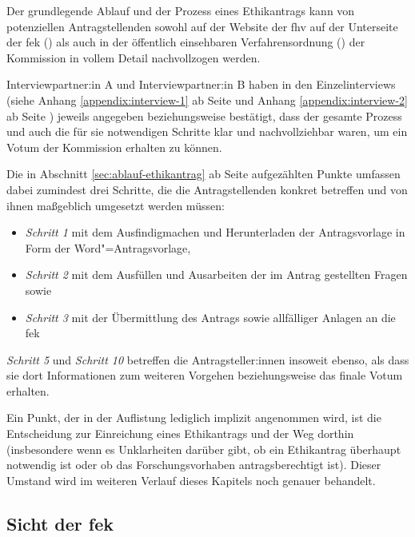 \documentclass[a4paper,12pt,twoside,numbers=noendperiod]{scrreprt}
\begin{document}
Der grundlegende Ablauf und der Prozess eines Ethikantrags kann von potenziellen Antragstellenden sowohl auf der Website der \ac{fhv} auf der Unterseite der \ac{fek} (\cite{fachhochschule_vorarlberg_gmbh_forschungsethik-kommission_2021}) als auch in der öffentlich einsehbaren Verfahrensordnung (\cite{forschungsethik-kommission_der_fachhochschule_vorarlberg_verfahrensordnung_2020}) der Kommission in vollem Detail nachvollzogen werden.

Interviewpartner:in A und Interviewpartner:in B haben in den Einzelinterviews (siehe Anhang \ref{appendix:interview-1} ab Seite \pageref{appendix:interview-1} und Anhang \ref{appendix:interview-2} ab Seite \pageref{appendix:interview-2}) jeweils angegeben beziehungsweise bestätigt, dass der gesamte Prozess und auch die für sie notwendigen Schritte klar und nachvollziehbar waren, um ein Votum der Kommission erhalten zu können.

\medskip

Die in Abschnitt \ref{sec:ablauf-ethikantrag} ab Seite \pageref{sec:ablauf-ethikantrag} aufgezählten Punkte umfassen dabei zumindest drei Schritte, die die Antragstellenden konkret betreffen und von ihnen maßgeblich umgesetzt werden müssen:
\begin{itemize}
    \item \textit{Schritt 1} mit dem Ausfindigmachen und Herunterladen der Antragsvorlage in Form der Word"=Antragsvorlage,
    \item \textit{Schritt 2} mit dem Ausfüllen und Ausarbeiten der im Antrag gestellten Fragen sowie
    \item \textit{Schritt 3} mit der Übermittlung des Antrags sowie allfälliger Anlagen an die \ac{fek}
\end{itemize}

\noindent\textit{Schritt 5} und \textit{Schritt 10} betreffen die Antragsteller:innen insoweit ebenso, als dass sie dort Informationen zum weiteren Vorgehen beziehungsweise das finale Votum erhalten.

Ein Punkt, der in der Auflistung lediglich implizit angenommen wird, ist die Entscheidung zur Einreichung eines Ethikantrags und der Weg dorthin (insbesondere wenn es Unklarheiten darüber gibt, ob ein Ethikantrag überhaupt notwendig ist oder ob das Forschungsvorhaben antragsberechtigt ist). Dieser Umstand wird im weiteren Verlauf dieses Kapitels noch genauer behandelt.

\subsection{Sicht der \acl{fek}}
\label{sub-sec:ablauf-sicht-fek}
\end{document}
